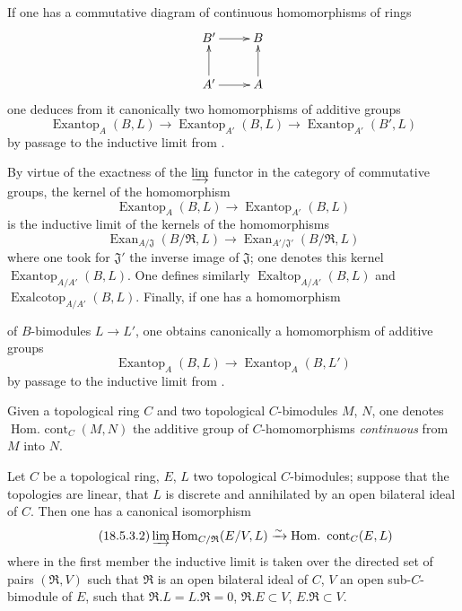 \begin{env}[18.5.2]
\label{0.18.5.2}
If one has a commutative diagram of continuous homomorphisms of rings
\[
  \xymatrix{
    B'\ar[r] & B\\
    A'\ar[u]\ar[r] & A\ar[u]
  }
\]
one deduces from it canonically two homomorphisms of additive groups
\[
  \operatorname{Exantop}_A(B,L)\to\operatorname{Exantop}_{A'}(B,L)\to\operatorname{Exantop}_{A'}(B',L)
\]
by passage to the inductive limit from .

By virtue of the exactness of the $\varinjlim$ functor in the category of commutative groups, the kernel of the homomorphism
\[
  \operatorname{Exantop}_A(B,L)\to\operatorname{Exantop}_{A'}(B,L)
\]
is the inductive limit of the kernels of the homomorphisms
\[
  \operatorname{Exan}_{A/\mathfrak{J}}(B/\mathfrak{R},L)\to\operatorname{Exan}_{A'/\mathfrak{J}'}(B/\mathfrak{R},L)
\]
where one took for $\mathfrak{J}'$ the inverse image of $\mathfrak{J}$; one denotes this kernel $\operatorname{Exantop}_{A/A'}(B,L)$.
One defines similarly $\operatorname{Exaltop}_{A/A'}(B,L)$ and $\operatorname{Exalcotop}_{A/A'}(B,L)$.
Finally, if one has a homomorphism


of $B$-bimodules $L\to L'$, one obtains canonically a homomorphism of additive groups
\[
  \operatorname{Exantop}_A(B,L)\to\operatorname{Exantop}_A(B,L')
\]
by passage to the inductive limit from .
\end{env}

\begin{env}[18.5.3]
\label{0.18.5.3}
Given a topological ring $C$ and two topological $C$-bimodules $M$, $N$, one denotes $\operatorname{Hom.\ cont}_C(M,N)$ the additive group of $C$-homomorphisms \emph{continuous} from $M$ into $N$.
\end{env}

\begin{lemma}[18.5.3.1]
\label{0.18.5.3.1}
Let $C$ be a topological ring, $E$, $L$ two topological $C$-bimodules; suppose that the topologies are linear, that $L$ is discrete and annihilated by an open bilateral ideal of $C$.
Then one has a canonical isomorphism
\begin{equation}
\tag{18.5.3.2}
  \label{0.18.5.3.2}
  \varinjlim\operatorname{Hom}_{C/\mathfrak{R}}(E/V,L)\xrightarrow{\sim}\operatorname{Hom.\ cont}_C(E,L)
\end{equation}
where in the first member the inductive limit is taken over the directed set of pairs $(\mathfrak{R},V)$ such that $\mathfrak{R}$ is an open bilateral ideal of $C$, $V$ an open sub-$C$-bimodule of $E$, such that $\mathfrak{R}.L=L.\mathfrak{R}=0$, $\mathfrak{R}.E\subset V$, $E.\mathfrak{R}\subset V$.
\end{lemma}

